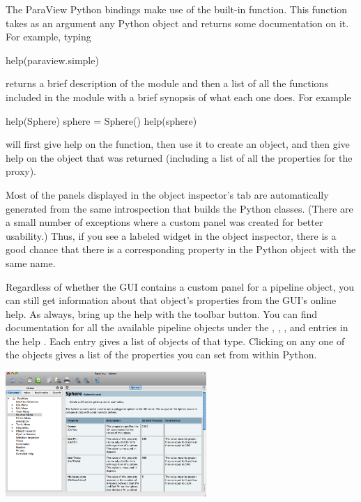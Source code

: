 The ParaView Python bindings make use of the  built-in
function.  This function takes as an argument any Python object and returns
some documentation on it.  For example, typing
\begin{python}
  help(paraview.simple)
\end{python}
returns a brief description of the module and then a list of all the
functions included in the module with a brief synopsis of what each one
does.  For example
\begin{python}
  help(Sphere)
  sphere = Sphere()
  help(sphere)
\end{python}
will first give help on the  function, then use it to create
an object, and then give help on the object that was returned (including a
list of all the properties for the proxy).

Most of the panels displayed in the object inspector's  tab
are automatically generated from the same introspection that builds the
Python classes. (There are a small number of exceptions where a custom
panel was created for better usability.) Thus, if you see a labeled widget
in the object inspector, there is a good chance that there is a
corresponding property in the Python object with the same name.

Regardless of whether the GUI contains a custom panel for a pipeline
object, you can still get information about that object's properties from
the GUI's online help.  As always, bring up the help with the
 toolbar button.  You can find documentation for all the
available pipeline objects under the , , , and  entries in the help
.  Each entry gives a list of objects of that type.  Clicking
on any one of the objects gives a list of the properties you can set from
within Python.

\begin{inlinefig}
  \includegraphics[width=3in]{images/ObjectHelp}
\end{inlinefig}


